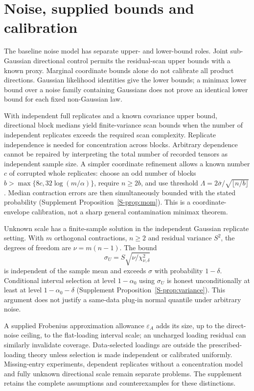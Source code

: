 \documentclass[11pt]{article}
\begin{document}
\section{Noise, supplied bounds and calibration}\label{sec:robustness}
The baseline noise model has separate upper- and lower-bound roles. Joint sub-Gaussian directional control permits the residual-scan upper bounds with a known proxy. Marginal coordinate bounds alone do not calibrate all product directions. Gaussian likelihood identities give the lower bounds; a minimax lower bound over a noise family containing Gaussians does not prove an identical lower bound for each fixed non-Gaussian law.

With independent full replicates and a known covariance upper bound, directional block medians yield finite-variance scan bounds when the number of independent replicates exceeds the required scan complexity. Replicate independence is needed for concentration across blocks. Arbitrary dependence cannot be repaired by interpreting the total number of recorded tensors as independent sample size. A simpler coordinate refinement allows a known number $c$ of corrupted whole replicates: choose an odd number of blocks $b>\max\{8c,32\log(m/\alpha)\}$, require $n\ge2b$, and use threshold $\Lambda=2\bar\sigma/\sqrt{\lfloor n/b\rfloor}$. Median contraction errors are then simultaneously bounded with the stated probability (Supplement Proposition~\ref{S-prop:mom}). This is a coordinate-envelope calibration, not a sharp general contamination minimax theorem.

Unknown scale has a finite-sample solution in the independent Gaussian replicate setting. With $m$ orthogonal contractions, $n\ge2$ and residual variance $S^2$, the degrees of freedom are $\nu=m(n-1)$. The bound
\[
 \sigma_U=S\sqrt{\nu/\chi^2_{\nu,\delta}}
\]
is independent of the sample mean and exceeds $\sigma$ with probability $1-\delta$. Conditional interval selection at level $1-\alpha_0$ using $\sigma_U$ is honest unconditionally at least at level $1-\alpha_0-\delta$ (Supplement Proposition~\ref{S-prop:variance}). This argument does not justify a same-data plug-in normal quantile under arbitrary noise.

A supplied Frobenius approximation allowance $\varepsilon_A$ adds its size, up to the direct-noise ceiling, to the flat-loading interval scale; an uncharged loading residual can similarly invalidate coverage. Data-selected loadings are outside the prescribed-loading theory unless selection is made independent or calibrated uniformly. Missing-entry experiments, dependent replicates without a concentration model and fully unknown directional scale remain separate problems. The supplement retains the complete assumptions and counterexamples for these distinctions.
\end{document}
